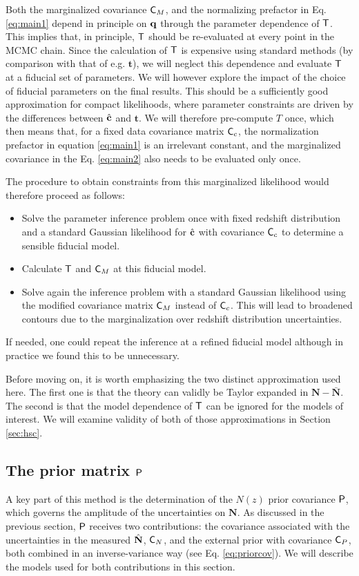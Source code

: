 \documentclass[a4paper,11pt]{article}
\newcommand{\vt}{\mathbf{t}}
\newcommand{\vN}{\mathbf{N}}
\begin{document}
      Both the marginalized covariance ${\sf C}_M$, and the normalizing prefactor in Eq. \ref{eq:main1} depend in principle on ${\bf q}$ through the parameter dependence of ${\sf T}$. This implies that, in principle, ${\sf T}$ should be re-evaluated at every point in the MCMC chain. Since the calculation of ${\sf T}$ is expensive using standard methods (by comparison with that of e.g. $\vt$), we will neglect this dependence and evaluate ${\sf T}$ at a fiducial set of parameters. We will however explore the impact of the choice of fiducial parameters on the final results. This should be a sufficiently good approximation for compact likelihoods, where parameter constraints are driven by the differences between $\hat{\bf c}$ and $\vt$. We will therefore pre-compute $T$ once, which then means that, for a fixed data covariance matrix ${\sf C}_c$, the normalization prefactor in equation \ref{eq:main1} is an irrelevant constant, and the marginalized covariance in the Eq. \ref{eq:main2} also needs to be evaluated only once.

      The procedure to obtain constraints from this marginalized likelihood would therefore proceed as follows:
      \begin{itemize}
        \item Solve the parameter inference problem once with fixed redshift distribution and a standard Gaussian likelihood for $\hat{\bf c}$ with covariance ${\sf C}_c$ to determine a sensible fiducial model.
        \item Calculate ${\sf T}$ and ${\sf C}_M$ at this fiducial model.
        \item Solve again the inference problem with a standard Gaussian likelihood using the modified covariance matrix ${\sf C}_M$ instead of ${\sf C}_c$. This will lead to broadened contours due to the marginalization over redshift distribution uncertainties.
      \end{itemize}
      If needed, one could repeat the inference at a refined fiducial model although in practice we found this to be unnecessary.

      Before moving on, it is worth emphasizing the two distinct approximation used here. The first one is that the theory can validly be Taylor expanded in $\vN-\bar{\vN}$. The second is that the model dependence of ${\sf T}$ can be ignored for the models of interest. We will examine validity of both of those approximations in Section \ref{sec:hsc}.
      
    \subsection{The prior matrix ${\sf P}$}\label{ssec:theory.prior}
      A key part of this method is the determination of the $N(z)$ prior covariance ${\sf P}$, which governs the amplitude of the uncertainties on $\vN$. As discussed in the previous section, ${\sf P}$ receives two contributions: the covariance associated with the uncertainties in the measured $\hat{\bf N}$, ${\sf C}_N$, and the external prior with covariance ${\sf C}_P$, both combined in an inverse-variance way (see Eq. \ref{eq:priorcov}). We will describe the models used for both contributions in this section.
\end{document}
